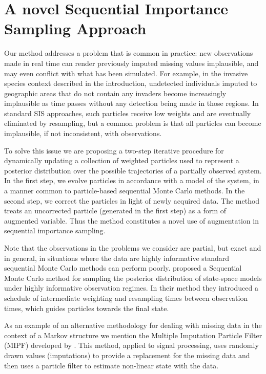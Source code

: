 \chapter[A novel Sequential Importance Sampling Approach]{A novel Sequential Importance Sampling Approach}
\label{ch:SIS}

Our method addresses a problem that is common in practice: new observations made in real time can render previously imputed missing values implausible, and may even conflict with what has been simulated. For example, in the invasive species context described in the introduction, undetected individuals imputed to geographic areas that do not contain any invaders become increasingly implausible as time passes without any detection being made in those regions. In standard SIS approaches, such particles receive low weights and are eventually eliminated by resampling, but a common problem is that all particles can become implausible, if not inconsistent, with observations.

To solve this issue we are proposing a two-step iterative procedure for dynamically updating a collection of weighted particles used to represent a posterior distribution over the possible trajectories of a partially observed system. In the first step, we evolve particles in accordance with a model of the system, in a manner common to particle-based sequential Monte Carlo methods. In the second step, we correct the particles in light of newly acquired data. The method treats an uncorrected particle (generated in the first step) as a form of augmented variable. Thus the method constitutes a novel use of augmentation in sequential importance sampling. 

Note that the observations in the problems we consider are partial, but exact and in general, in situations where the data are highly informative standard sequential Monte Carlo methods can perform poorly. \cite{DelMoral} proposed a Sequential Monte Carlo method for sampling the posterior distribution of state-space models under highly informative observation regimes. In their method they introduced a schedule of intermediate weighting and resampling times between observation times, which guides particles towards the final state.

As an example of an alternative methodology for dealing with missing data in the context of a Markov structure we mention the Multiple Imputation Particle Filter (MIPF) developed by \cite{Zhang}. This method, applied to signal processing, uses randomly drawn values (imputations) to provide a replacement for the missing data and then uses a particle filter to estimate non-linear state with the data.

